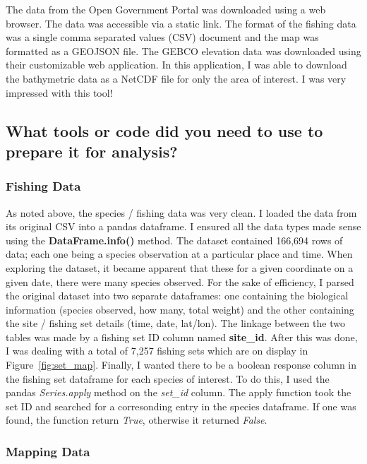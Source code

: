 The data from the Open Government Portal was downloaded using a web browser.
The data was accessible via a static link.
The format of the fishing data was a single comma separated values (CSV) document and the map was formatted as a GEOJSON file.
The GEBCO elevation data was downloaded using their customizable web application.
In this application, I was able to download the bathymetric data as a NetCDF file for only the area of interest.
I was very impressed with this tool!


\subsection{What tools or code did you need to use to prepare it for analysis?}


\subsubsection{Fishing Data}

As noted above, the species / fishing data was very clean.
I loaded the data from its original CSV into a pandas dataframe.
I ensured all the data types made sense using the \textbf{DataFrame.info()} method.
The dataset contained 166,694 rows of data; each one being a species observation at a particular place and time.
When exploring the dataset, it became apparent that these for a given coordinate on a given date, there were many species observed.
For the sake of efficiency, I parsed the original dataset into two separate dataframes:
one containing the biological information (species observed, how many, total weight)
and the other containing the site / fishing set details (time, date, lat/lon).
The linkage between the two tables was made by a fishing set ID column named \textbf{site\_id}.
After this was done, I was dealing with a total of 7,257 fishing sets which are on display in Figure~\ref{fig:set_map}.
Finally, I wanted there to be a boolean response column in the fishing set dataframe for each species of interest.
To do this, I used the pandas \textit{Series.apply} method on the \textit{set\_id} column.
The apply function took the set ID and searched for a corresonding entry in the species dataframe.
If one was found, the function return \textit{True}, otherwise it returned \textit{False}.


\subsubsection{Mapping Data}

